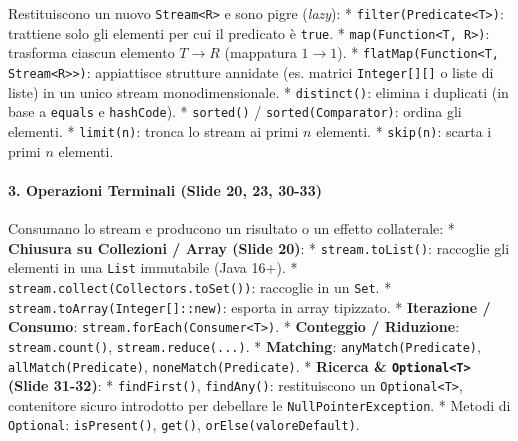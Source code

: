 \documentclass[11pt,a4paper]{article}
\newcommand{\passthrough}[1]{#1}
\begin{document}
Restituiscono un nuovo \passthrough{\lstinline!Stream<R>!} e sono pigre
(\emph{lazy}): * \passthrough{\lstinline!filter(Predicate<T>)!}:
trattiene solo gli elementi per cui il predicato è
\passthrough{\lstinline!true!}. *
\passthrough{\lstinline!map(Function<T, R>)!}: trasforma ciascun
elemento \(T \to R\) (mappatura \(1 \to 1\)). *
\passthrough{\lstinline!flatMap(Function<T, Stream<R>>)!}: appiattisce
strutture annidate (es. matrici \passthrough{\lstinline!Integer[][]!} o
liste di liste) in un unico stream monodimensionale. *
\passthrough{\lstinline!distinct()!}: elimina i duplicati (in base a
\passthrough{\lstinline!equals!} e \passthrough{\lstinline!hashCode!}).
* \passthrough{\lstinline!sorted()!} /
\passthrough{\lstinline!sorted(Comparator)!}: ordina gli elementi. *
\passthrough{\lstinline!limit(n)!}: tronca lo stream ai primi \(n\)
elementi. * \passthrough{\lstinline!skip(n)!}: scarta i primi \(n\)
elementi.

\paragraph{3. Operazioni Terminali (Slide 20, 23,
30-33)}\label{operazioni-terminali-slide-20-23-30-33}

Consumano lo stream e producono un risultato o un effetto collaterale: *
\textbf{Chiusura su Collezioni / Array (Slide 20)}: *
\passthrough{\lstinline!stream.toList()!}: raccoglie gli elementi in una
\passthrough{\lstinline!List!} immutabile (Java 16+). *
\passthrough{\lstinline!stream.collect(Collectors.toSet())!}: raccoglie
in un \passthrough{\lstinline!Set!}. *
\passthrough{\lstinline!stream.toArray(Integer[]::new)!}: esporta in
array tipizzato. * \textbf{Iterazione / Consumo}:
\passthrough{\lstinline!stream.forEach(Consumer<T>)!}. *
\textbf{Conteggio / Riduzione}:
\passthrough{\lstinline!stream.count()!},
\passthrough{\lstinline!stream.reduce(...)!}. * \textbf{Matching}:
\passthrough{\lstinline!anyMatch(Predicate)!},
\passthrough{\lstinline!allMatch(Predicate)!},
\passthrough{\lstinline!noneMatch(Predicate)!}. * \textbf{Ricerca \&
\passthrough{\lstinline!Optional<T>!} (Slide 31-32)}: *
\passthrough{\lstinline!findFirst()!},
\passthrough{\lstinline!findAny()!}: restituiscono un
\passthrough{\lstinline!Optional<T>!}, contenitore sicuro introdotto per
debellare le \passthrough{\lstinline!NullPointerException!}. * Metodi di
\passthrough{\lstinline!Optional!}:
\passthrough{\lstinline!isPresent()!}, \passthrough{\lstinline!get()!},
\passthrough{\lstinline!orElse(valoreDefault)!}.
\end{document}
